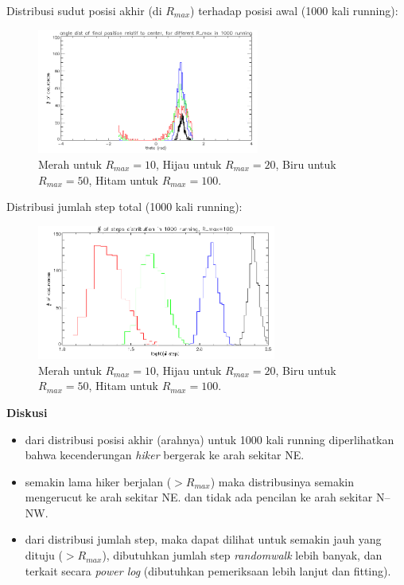 \documentclass[paper=a4, fontsize=11pt]{scrartcl}
\numberwithin{equation}{section} %
\numberwithin{figure}{section} %
\numberwithin{table}{section} %
\begin{document}
Distribusi sudut posisi akhir (di $R_{max}$) terhadap posisi awal (1000 kali running):
\begin{figure}
	\centering
	\includegraphics[width=0.65\textwidth]{hiker-theta.PNG}
	\caption{Merah untuk $R_{max} = 10$, Hijau untuk $R_{max} = 20$, Biru untuk $R_{max} = 50$, Hitam untuk $R_{max} = 100$.}
\end{figure}

\newpage
Distribusi jumlah step total (1000 kali running):
\begin{figure}
	\centering
	\includegraphics[width=0.7\textwidth]{hiker-nstep.PNG}
	\caption{Merah untuk $R_{max} = 10$, Hijau untuk $R_{max} = 20$, Biru untuk $R_{max} = 50$, Hitam untuk $R_{max} = 100$.}
\end{figure}

\textbf{Diskusi}
\begin{itemize}


\item dari distribusi posisi akhir (arahnya) untuk 1000 kali running diperlihatkan bahwa kecenderungan \textit{hiker} bergerak ke arah sekitar NE.
\item semakin lama hiker berjalan ($>R_{max}$) maka distribusinya semakin mengerucut ke arah sekitar NE. dan tidak ada pencilan ke arah sekitar N\---NW.
\item dari distribusi jumlah step, maka dapat dilihat untuk semakin jauh yang dituju ($>R_{max}$), dibutuhkan jumlah step \textit{randomwalk} lebih banyak, dan terkait secara \textit{power log} (dibutuhkan pemeriksaan lebih lanjut dan fitting).
\end{itemize}
\end{document}
